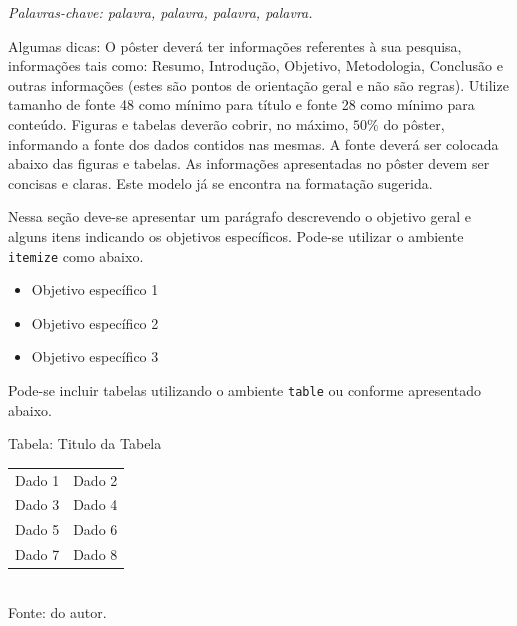 \documentclass[a0paper,portrait]{baposter}
\begin{document}
\begin{poster}
{\textit{Palavras-chave: palavra, palavra, palavra, palavra.}
}


{Algumas dicas:
O pôster deverá ter informações referentes à sua pesquisa, informações tais como: Resumo, Introdução, Objetivo, Metodologia, Conclusão e outras informações (estes são pontos de orientação geral e não são regras).
Utilize tamanho de fonte 48 como mínimo para título e fonte 28 como mínimo para conteúdo.
Figuras e tabelas deverão cobrir, no máximo, $50\%$ do pôster, informando a fonte dos dados contidos nas mesmas. A fonte deverá ser colocada abaixo das figuras e tabelas.
As informações apresentadas no pôster devem ser concisas e claras.
Este modelo já se encontra na formatação sugerida.}





{Nessa seção deve-se apresentar um parágrafo descrevendo o objetivo geral e alguns itens indicando os objetivos específicos. Pode-se utilizar o ambiente \texttt{itemize} como abaixo.

\begin{itemize}
    \item Objetivo específico 1
    \item Objetivo específico 2
    \item Objetivo específico 3
\end{itemize}

\vspace{9cm}

}

{Pode-se incluir tabelas utilizando o ambiente \texttt{table} ou conforme apresentado abaixo.
\begin{center}
Tabela: Titulo da Tabela\\
\begin{tabular}{|c|c|}
\hline
    Dado 1 & Dado 2 \\
    Dado 3 & Dado 4  \\
    Dado 5 & Dado 6 \\
    Dado 7 & Dado 8  \\
\hline
\end{tabular}\\
Fonte: do autor.
\end{center}

}
\end{poster}
\end{document}
